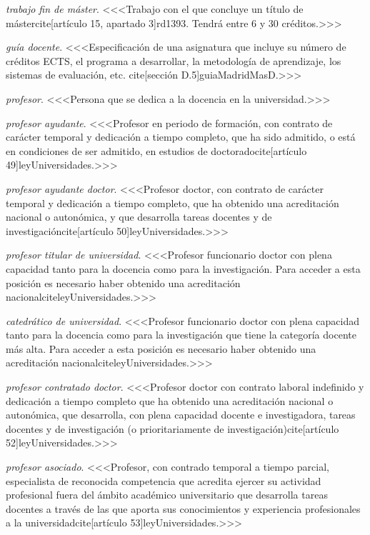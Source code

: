     \item \emph{trabajo fin de máster}. <<<Trabajo con el que concluye un título de mástercite[artículo 15, apartado 3]{rd1393}. Tendrá entre 6 y 30 créditos.>>>

    \item \emph{guía docente}. <<<Especificación de una asignatura que incluye su número de créditos ECTS, el programa a desarrollar, la metodología de aprendizaje, los sistemas de evaluación, etc. cite[sección D.5]{guiaMadridMasD}.>>>

    \item \emph{profesor}. <<<Persona que se dedica a la docencia en la universidad.>>>

    \item \emph{profesor ayudante}. <<<Profesor en periodo de formación, con contrato de carácter temporal y dedicación a tiempo completo, que ha sido admitido, o está en condiciones de ser admitido, en estudios de doctoradocite[artículo 49]{leyUniversidades}.>>>

    \item \emph{profesor ayudante doctor}. <<<Profesor doctor, con contrato de carácter temporal y dedicación a tiempo completo, que ha obtenido una acreditación nacional o autonómica, y que desarrolla tareas docentes y de investigacióncite[artículo 50]{leyUniversidades}.>>>  

    \item \emph{profesor titular de universidad}. <<<Profesor funcionario doctor con plena capacidad tanto para la docencia como para la investigación. Para acceder a esta posición es necesario haber obtenido una acreditación nacionalcite{leyUniversidades}.>>>

    \item \emph{catedrático de universidad}. <<<Profesor funcionario doctor con plena capacidad tanto para la docencia como para la investigación que tiene la categoría docente más alta. Para acceder a esta posición es necesario haber obtenido una acreditación nacionalcite{leyUniversidades}.>>>

    \item \emph{profesor contratado doctor}. <<<Profesor doctor con contrato laboral indefinido y dedicación a tiempo completo que ha obtenido una acreditación nacional o autonómica, que desarrolla, con plena capacidad docente e investigadora, tareas docentes y de investigación (o prioritariamente de investigación)cite[artículo 52]{leyUniversidades}.>>>

    \item \emph{profesor asociado}. <<<Profesor, con contrado temporal a tiempo parcial, especialista de reconocida competencia que acredita ejercer su actividad profesional fuera del ámbito académico universitario que desarrolla tareas docentes a través de las que aporta sus conocimientos y experiencia profesionales a la universidadcite[artículo 53]{leyUniversidades}.>>>

